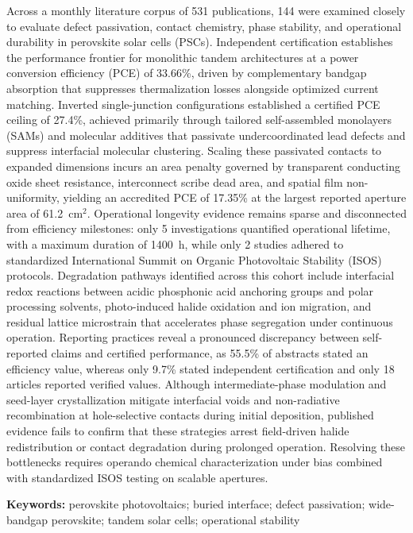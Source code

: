 \documentclass[
  11pt,
]{article}
\begin{document}
Across a monthly literature corpus of 531 publications, 144 were
examined closely to evaluate defect passivation, contact chemistry,
phase stability, and operational durability in perovskite solar cells
(PSCs). Independent certification establishes the performance frontier
for monolithic tandem architectures at a power conversion efficiency
(PCE) of 33.66\%, driven by complementary bandgap absorption that
suppresses thermalization losses alongside optimized current matching.
Inverted single-junction configurations established a certified PCE
ceiling of 27.4\%, achieved primarily through tailored self-assembled
monolayers (SAMs) and molecular additives that passivate
undercoordinated lead defects and suppress interfacial molecular
clustering. Scaling these passivated contacts to expanded dimensions
incurs an area penalty governed by transparent conducting oxide sheet
resistance, interconnect scribe dead area, and spatial film
non-uniformity, yielding an accredited PCE of 17.35\% at the largest
reported aperture area of \qty{61.2}{\centi\meter}\(^2\). Operational
longevity evidence remains sparse and disconnected from efficiency
milestones: only 5 investigations quantified operational lifetime, with
a maximum duration of \qty{1400}{\hour}, while only 2 studies adhered to
standardized International Summit on Organic Photovoltaic Stability
(ISOS) protocols. Degradation pathways identified across this cohort
include interfacial redox reactions between acidic phosphonic acid
anchoring groups and polar processing solvents, photo-induced halide
oxidation and ion migration, and residual lattice microstrain that
accelerates phase segregation under continuous operation. Reporting
practices reveal a pronounced discrepancy between self-reported claims
and certified performance, as 55.5\% of abstracts stated an efficiency
value, whereas only 9.7\% stated independent certification and only 18
articles reported verified values. Although intermediate-phase
modulation and seed-layer crystallization mitigate interfacial voids and
non-radiative recombination at hole-selective contacts during initial
deposition, published evidence fails to confirm that these strategies
arrest field-driven halide redistribution or contact degradation during
prolonged operation. Resolving these bottlenecks requires operando
chemical characterization under bias combined with standardized ISOS
testing on scalable apertures.

\textbf{Keywords:} perovskite photovoltaics; buried interface; defect
passivation; wide-bandgap perovskite; tandem solar cells; operational
stability
\end{document}
